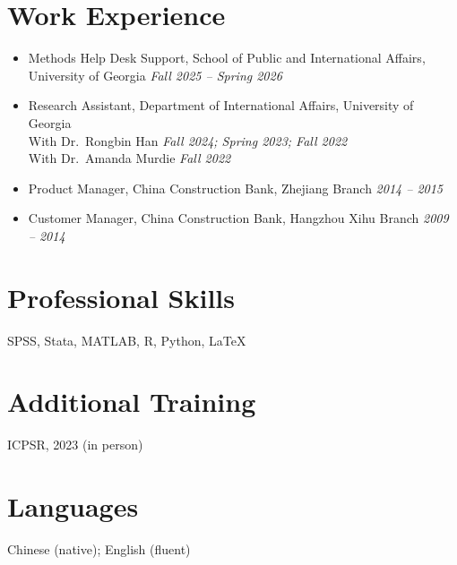 \documentclass[11pt]{article}
\begin{document}
	\section*{Work Experience}
	\begin{itemize}
		\item Methods Help Desk Support, School of Public and International Affairs, University of Georgia \hfill \emph{Fall 2025 -- Spring 2026}
		\item Research Assistant, Department of International Affairs, University of Georgia\\
		\quad With Dr.\ Rongbin Han \hfill \emph{Fall 2024; Spring 2023; Fall 2022}\\
		\quad With Dr.\ Amanda Murdie \hfill \emph{Fall 2022}
		\item Product Manager, China Construction Bank, Zhejiang Branch \hfill \emph{2014 -- 2015}
		\item Customer Manager, China Construction Bank, Hangzhou Xihu Branch \hfill \emph{2009 -- 2014}
	\end{itemize}
	
	\section*{Professional Skills}
	SPSS, Stata, MATLAB, R, Python, \LaTeX
	
	\section*{Additional Training}
	ICPSR, 2023 (in person)
	
	\section*{Languages}
	Chinese (native); English (fluent)
	
\end{document}
